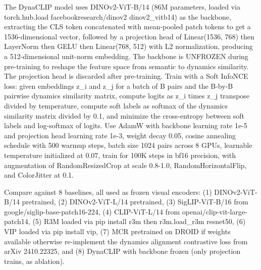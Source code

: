 \documentclass[11pt,a4paper]{article}
\begin{document}
The DynaCLIP model uses DINOv2-ViT-B/14 (86M parameters, loaded via torch.hub.load facebookresearch/dinov2 dinov2\_vitb14) as the backbone, extracting the CLS token concatenated with mean-pooled patch tokens to get a 1536-dimensional vector, followed by a projection head of Linear(1536, 768) then LayerNorm then GELU then Linear(768, 512) with L2 normalization, producing a 512-dimensional unit-norm embedding. The backbone is UNFROZEN during pre-training to reshape the feature space from semantic to dynamics similarity. The projection head is discarded after pre-training. Train with a Soft InfoNCE loss: given embeddings z\_i and z\_j for a batch of B pairs and the B-by-B pairwise dynamics similarity matrix, compute logits as z\_i times z\_j transpose divided by temperature, compute soft labels as softmax of the dynamics similarity matrix divided by 0.1, and minimize the cross-entropy between soft labels and log-softmax of logits. Use AdamW with backbone learning rate 1e-5 and projection head learning rate 1e-3, weight decay 0.05, cosine annealing schedule with 500 warmup steps, batch size 1024 pairs across 8 GPUs, learnable temperature initialized at 0.07, train for 100K steps in bf16 precision, with augmentation of RandomResizedCrop at scale 0.8-1.0, RandomHorizontalFlip, and ColorJitter at 0.1.

Compare against 8 baselines, all used as frozen visual encoders: (1) DINOv2-ViT-B/14 pretrained, (2) DINOv2-ViT-L/14 pretrained, (3) SigLIP-ViT-B/16 from google/siglip-base-patch16-224, (4) CLIP-ViT-L/14 from openai/clip-vit-large-patch14, (5) R3M loaded via pip install r3m then r3m.load\_r3m resnet50, (6) VIP loaded via pip install vip, (7) MCR pretrained on DROID if weights available otherwise re-implement the dynamics alignment contrastive loss from arXiv 2410.22325, and (8) DynaCLIP with backbone frozen (only projection trains, as ablation).
\end{document}
